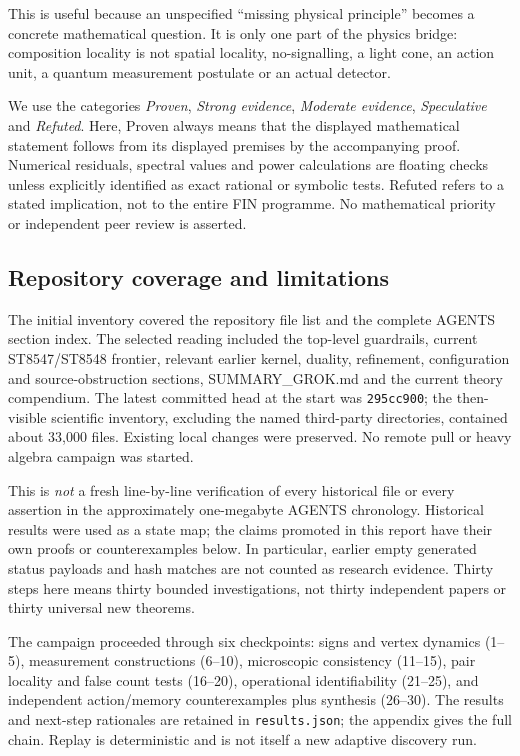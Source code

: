 \documentclass[11pt,a4paper]{article}
\begin{document}
This is useful because an unspecified ``missing physical principle'' becomes
a concrete mathematical question. It is only one part of the physics bridge:
composition locality is not spatial locality, no-signalling, a light cone,
an action unit, a quantum measurement postulate or an actual detector.

We use the categories \emph{Proven}, \emph{Strong evidence},
\emph{Moderate evidence}, \emph{Speculative} and \emph{Refuted}.
Here, Proven always means that the displayed mathematical statement follows
from its displayed premises by the accompanying proof. Numerical residuals,
spectral values and power calculations are floating checks unless explicitly
identified as exact rational or symbolic tests. Refuted refers to a stated
implication, not to the entire FIN programme. No mathematical priority or
independent peer review is asserted.

\subsection{Repository coverage and limitations}

The initial inventory covered the repository file list and the complete
AGENTS section index. The selected reading included the top-level guardrails,
current ST8547/ST8548 frontier, relevant earlier kernel, duality, refinement,
configuration and source-obstruction sections, SUMMARY\_GROK.md and the
current theory compendium. The latest committed head at the start was
\texttt{295cc900}; the then-visible scientific inventory, excluding the named
third-party directories, contained about 33,000 files. Existing local changes
were preserved. No remote pull or heavy algebra campaign was started.

This is \emph{not} a fresh line-by-line verification of every historical file
or every assertion in the approximately one-megabyte AGENTS chronology.
Historical results were used as a state map; the claims promoted in this
report have their own proofs or counterexamples below. In particular, earlier
empty generated status payloads and hash matches are not counted as research
evidence. Thirty steps here means thirty bounded investigations, not thirty
independent papers or thirty universal new theorems.

The campaign proceeded through six checkpoints: signs and vertex dynamics
(1--5), measurement constructions (6--10), microscopic consistency (11--15),
pair locality and false count tests (16--20), operational identifiability
(21--25), and independent action/memory counterexamples plus synthesis
(26--30). The results and next-step rationales are retained in
\texttt{results.json}; the appendix gives the full chain. Replay is
deterministic and is not itself a new adaptive discovery run.
\end{document}
